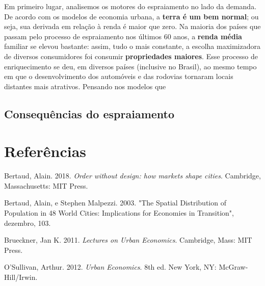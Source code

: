 \documentclass[
  12pt,
  a4paper,
]{article}
\newlength{\cslhangindent}
\newlength{\cslentryspacingunit} %
\newenvironment{CSLReferences}[2] %
 {%
  \setlength{\parindent}{0pt}
  \ifodd #1
  \let\oldpar\par
  \def\par{\hangindent=\cslhangindent\oldpar}
  \fi
  \setlength{\parskip}{#2\cslentryspacingunit}
 }%
 {}
\begin{document}
Em primeiro lugar, analisemos os motores do espraiamento no lado da
demanda. De acordo com os modelos de economia urbana, a \textbf{terra é
um bem normal}; ou seja, sua derivada em relação à renda é maior que
zero. Na maioria dos países que passam pelo processo de espraiamento nos
últimos 60 anos, a \textbf{renda média} familiar se elevou bastante:
assim, tudo o mais constante, a escolha maximizadora de diversos
consumidores foi consumir \textbf{propriedades maiores}. Esse processo
de enriquecimento se deu, em diversos países (inclusive no Brasil), ao
mesmo tempo em que o desenvolvimento dos automóveis e das rodovias
tornaram locais distantes mais atrativos. Pensando nos modelos que

\hypertarget{consequuxeancias-do-espraiamento}{%
\subsection{Consequências do
espraiamento}\label{consequuxeancias-do-espraiamento}}

\hypertarget{referuxeancias}{%
\section*{Referências}\label{referuxeancias}}

\hypertarget{refs}{}
\begin{CSLReferences}{1}{0}
\leavevmode{}%
Bertaud, Alain. 2018. \emph{Order without design: how markets shape
cities}. Cambridge, Massachusetts: MIT Press.

\leavevmode{}%
Bertaud, Alain, e Stephen Malpezzi. 2003. {"The Spatial Distribution of
Population in 48 World Cities: Implications for Economies in
Transition"}, dezembro, 103.

\leavevmode{}%
Brueckner, Jan K. 2011. \emph{Lectures on Urban Economics}. Cambridge,
Mass: MIT Press.

\leavevmode{}%
O'Sullivan, Arthur. 2012. \emph{Urban Economics}. 8th ed. New York, NY:
McGraw-Hill/Irwin.

\end{CSLReferences}
\end{document}
